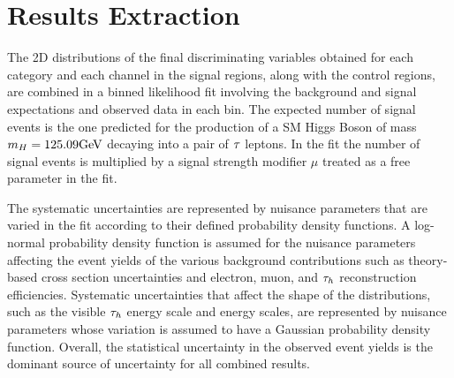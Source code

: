 %


\section{Results Extraction}
\label{sec:htt_fit_details}
The 2D distributions of the final discriminating variables obtained for each category and each channel in the 
signal regions, along with the control regions, are combined in a binned likelihood fit involving the 
background and signal expectations and observed data in each bin.
The expected number of signal events is the one predicted for the production of
a SM Higgs Boson of mass $m_{H}=125.09\mathrm{GeV}$ decaying into a pair of $\tau$ leptons. In the fit
the number of signal events is
multiplied by a signal strength modifier $\mu$ treated as a free parameter in the fit.

The systematic uncertainties are represented by nuisance parameters that are varied in the fit 
according to their defined probability density functions.
A log-normal probability density function is assumed for the nuisance parameters affecting the event yields 
of the various background contributions such as theory-based cross section uncertainties and
electron, muon, and $\tau_{h}$ reconstruction efficiencies. Systematic uncertainties that affect the shape of the 
distributions, such as the visible $\tau_{h}$ energy scale and \etvecmiss energy scales, are represented 
by nuisance parameters whose variation 
is assumed to have a Gaussian probability density function.
Overall, the statistical uncertainty in the observed event yields is the dominant source of uncertainty 
for all combined results.


